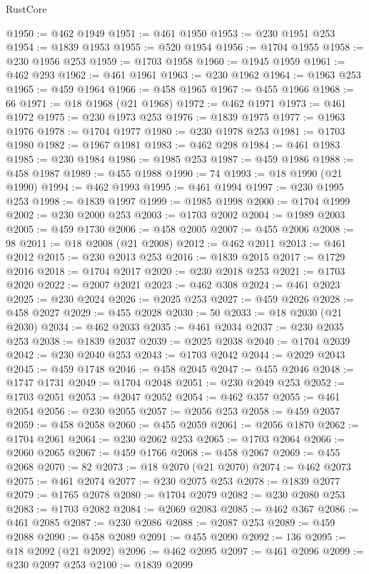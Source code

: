 \begin{lexlean}{RustCore}
\begin{coremodule}
@1950 := @462 @1949
@1951 := @461 @1950
@1953 := @230 @1951 @253
@1954 := @1839 @1953
@1955 := @520 @1954
@1956 := @1704 @1955
@1958 := @230 @1956 @253
@1959 := @1703 @1958
@1960 := @1945 @1959
@1961 := @462 @293
@1962 := @461 @1961
@1963 := @230 @1962
@1964 := @1963 @253
@1965 := @459 @1964
@1966 := @458 @1965
@1967 := @455 @1966
@1968 := 66
@1971 := @18 @1968 (@21 @1968)
@1972 := @462 @1971
@1973 := @461 @1972
@1975 := @230 @1973 @253
@1976 := @1839 @1975
@1977 := @1963 @1976
@1978 := @1704 @1977
@1980 := @230 @1978 @253
@1981 := @1703 @1980
@1982 := @1967 @1981
@1983 := @462 @298
@1984 := @461 @1983
@1985 := @230 @1984
@1986 := @1985 @253
@1987 := @459 @1986
@1988 := @458 @1987
@1989 := @455 @1988
@1990 := 74
@1993 := @18 @1990 (@21 @1990)
@1994 := @462 @1993
@1995 := @461 @1994
@1997 := @230 @1995 @253
@1998 := @1839 @1997
@1999 := @1985 @1998
@2000 := @1704 @1999
@2002 := @230 @2000 @253
@2003 := @1703 @2002
@2004 := @1989 @2003
@2005 := @459 @1730
@2006 := @458 @2005
@2007 := @455 @2006
@2008 := 98
@2011 := @18 @2008 (@21 @2008)
@2012 := @462 @2011
@2013 := @461 @2012
@2015 := @230 @2013 @253
@2016 := @1839 @2015
@2017 := @1729 @2016
@2018 := @1704 @2017
@2020 := @230 @2018 @253
@2021 := @1703 @2020
@2022 := @2007 @2021
@2023 := @462 @308
@2024 := @461 @2023
@2025 := @230 @2024
@2026 := @2025 @253
@2027 := @459 @2026
@2028 := @458 @2027
@2029 := @455 @2028
@2030 := 50
@2033 := @18 @2030 (@21 @2030)
@2034 := @462 @2033
@2035 := @461 @2034
@2037 := @230 @2035 @253
@2038 := @1839 @2037
@2039 := @2025 @2038
@2040 := @1704 @2039
@2042 := @230 @2040 @253
@2043 := @1703 @2042
@2044 := @2029 @2043
@2045 := @459 @1748
@2046 := @458 @2045
@2047 := @455 @2046
@2048 := @1747 @1731
@2049 := @1704 @2048
@2051 := @230 @2049 @253
@2052 := @1703 @2051
@2053 := @2047 @2052
@2054 := @462 @357
@2055 := @461 @2054
@2056 := @230 @2055
@2057 := @2056 @253
@2058 := @459 @2057
@2059 := @458 @2058
@2060 := @455 @2059
@2061 := @2056 @1870
@2062 := @1704 @2061
@2064 := @230 @2062 @253
@2065 := @1703 @2064
@2066 := @2060 @2065
@2067 := @459 @1766
@2068 := @458 @2067
@2069 := @455 @2068
@2070 := 82
@2073 := @18 @2070 (@21 @2070)
@2074 := @462 @2073
@2075 := @461 @2074
@2077 := @230 @2075 @253
@2078 := @1839 @2077
@2079 := @1765 @2078
@2080 := @1704 @2079
@2082 := @230 @2080 @253
@2083 := @1703 @2082
@2084 := @2069 @2083
@2085 := @462 @367
@2086 := @461 @2085
@2087 := @230 @2086
@2088 := @2087 @253
@2089 := @459 @2088
@2090 := @458 @2089
@2091 := @455 @2090
@2092 := 136
@2095 := @18 @2092 (@21 @2092)
@2096 := @462 @2095
@2097 := @461 @2096
@2099 := @230 @2097 @253
@2100 := @1839 @2099

\end{coremodule}
\end{lexlean}
